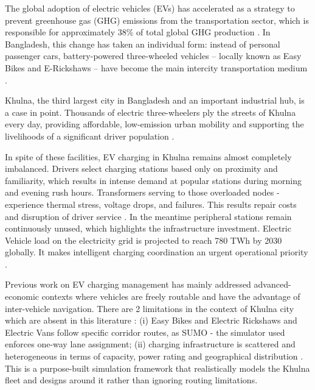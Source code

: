 \documentclass[conference]{IEEEtran}
\begin{document}
The global adoption of electric vehicles (EVs) has accelerated as a
strategy to prevent greenhouse gas (GHG) emissions from the
transportation sector, which is responsible for approximately 38\% of
total global GHG production \cite{b1}. In Bangladesh, this change has
taken an individual form: instead of personal passenger cars,
battery-powered three-wheeled vehicles -- locally known as Easy Bikes
and E-Rickshaws -- have become the main intercity transportation medium \cite{b9}.

Khulna, the third largest city in Bangladesh and an important industrial
hub, is a case in point. Thousands of electric three-wheelers ply the
streets of Khulna every day, providing affordable, low-emission urban
mobility and supporting the livelihoods of a significant driver
population \cite{b2}.

In spite of these facilities, EV charging in Khulna remains almost
completely imbalanced. Drivers select charging stations based only on
proximity and familiarity, which results in intense demand at popular
stations during morning and evening rush hours. Transformers serving to
those overloaded nodes - experience thermal stress, voltage drops, and
failures. This results repair costs and disruption of driver service \cite{b14}. In
the meantime peripheral stations remain continuously unused, which
highlights the infrastructure investment. Electric Vehicle load on the
electricity grid is projected to reach 780 TWh by 2030 \cite{b3, b4}
globally. It makes intelligent charging coordination an urgent
operational priority \cite{b16}.

Previous work on EV charging management has mainly addressed
advanced-economic contexts where vehicles are freely routable \cite{b5, b6} and have
the advantage of inter-vehicle navigation. There are 2 limitations in
the context of Khulna city which are absent in this literature : (i)
Easy Bikes and Electric Rickshaws and Electric Vans follow specific
corridor routes, as SUMO - the simulator used enforces one-way lane
assignment; (ii) charging infrastructure is scattered and heterogeneous
in terms of capacity, power rating and geographical distribution \cite{b15}. This
is a purpose-built simulation framework that realistically models the
Khulna fleet and designs around it rather than ignoring routing
limitations.
\end{document}
